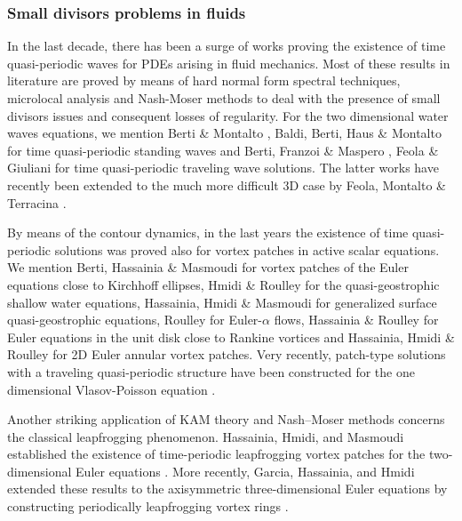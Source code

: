 \documentclass[a4paper,reqno,10pt]{article}
\begin{document}
\subsubsection{Small divisors problems in fluids}
In the last decade, there has been a  surge of works proving the existence of time quasi-periodic waves for PDEs arising in fluid mechanics.
Most of these results in literature are proved by means of hard normal form spectral techniques, microlocal analysis and Nash-Moser methods to deal with the presence of small divisors issues and consequent losses of regularity.
For the two dimensional water waves equations, we mention
Berti \& Montalto \cite{BM}, Baldi, Berti, Haus \& Montalto \cite{BBHM} for time quasi-periodic standing waves and Berti, Franzoi \& Maspero \cite{BFM24,BFM21}, Feola \& Giuliani \cite{FG} for time quasi-periodic traveling wave solutions. The latter works have recently been extended to the much more difficult 3D case by Feola, Montalto \& Terracina \cite{FMT25}.

By means of the contour dynamics, in the last years the existence of time quasi-periodic solutions was proved also for vortex patches in active scalar equations. 
We mention Berti, Hassainia \& Masmoudi \cite{BHM23} for vortex patches of
the Euler equations close to Kirchhoff ellipses, Hmidi \& Roulley \cite{HR21} for the 
quasi-geostrophic shallow water equations,  Hassainia, Hmidi \& Masmoudi \cite{HHM21} for generalized surface quasi-geostrophic equations, Roulley \cite{R22} for Euler-$\alpha$ flows, Hassainia \& Roulley \cite{HR21-1} for Euler equations in the unit disk close to Rankine vortices and Hassainia, Hmidi \& Roulley \cite{HHR23} for 2D Euler annular vortex patches. Very recently, patch-type solutions with a traveling quasi-periodic structure have been constructed for the one dimensional Vlasov-Poisson equation \cite{FR26}.

Another striking application of KAM theory and Nash–Moser methods concerns the classical leapfrogging phenomenon. Hassainia, Hmidi, and Masmoudi established the existence of time-periodic leapfrogging vortex patches for the two-dimensional Euler equations \cite{HHM24}. More recently, Garcia, Hassainia, and Hmidi extended these results to the axisymmetric three-dimensional Euler equations by constructing periodically leapfrogging vortex rings \cite{GHH26}.
\end{document}
